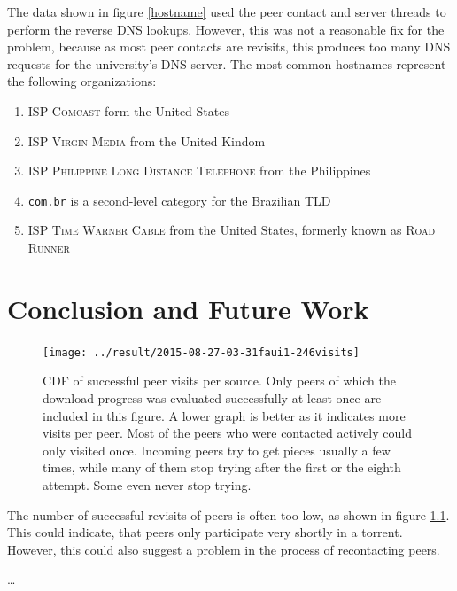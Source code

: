 \documentclass[10pt, a4paper, twoside, headsepline]{scrbook}
\renewcommand{\_}{\origunderscore\allowbreak}
\begin{document}
The data shown in figure \ref{hostname} used the peer contact and server threads to perform the reverse DNS lookups. However, this was not a reasonable fix for the problem, because as most peer contacts are revisits, this produces too many DNS requests for the university's DNS server. The most common hostnames represent the following organizations:
\begin{enumerate}
\item ISP \textsc{Comcast} form the United States
\item ISP \textsc{Virgin Media} from the United Kindom
\item ISP \textsc{Philippine Long Distance Telephone} from the Philippines
\item \texttt{com.br} is a second-level category for the Brazilian TLD
\item ISP \textsc{Time Warner Cable} from the United States, formerly known as \textsc{Road Runner}
\end{enumerate}

\chapter{Conclusion and Future Work}
\begin{figure}
\centering
\texttt{[image: ../result/2015-08-27\_21-03-31\_faui1-246\_visits]}
\caption[CDF of successful peer visits per source]{CDF of successful peer visits per source. Only peers of which the download progress was evaluated successfully at least once are included in this figure. A lower graph is better as it indicates more visits per peer. Most of the peers who were contacted actively could only visited once. Incoming peers try to get pieces usually a few times, while many of them stop trying after the first or the eighth attempt. Some even never stop trying.}
\label{visits}
\end{figure}

The number of successful revisits of peers is often too low, as shown in figure \ref{visits}. This could indicate, that peers only participate very shortly in a torrent. However, this could also suggest a problem in the process of recontacting peers.

\dots

\printbibheading[heading=bibintoc]
\begingroup
\setlength{}
\printbibliography[heading=subbibintoc, title={Literature}, keyword=science]
\printbibliography[heading=subbibintoc, title={Software}, keyword=software]
\printbibliography[heading=subbibintoc, title={Online}, keyword=online]
\printbibliography[heading=subbibintoc, title={Other}, notkeyword=science, notkeyword=standard, notkeyword=software, notkeyword=online] %
\endgroup
\printbibliography[heading=subbibintoc, title={Standards}, keyword=standard]
\end{document}
